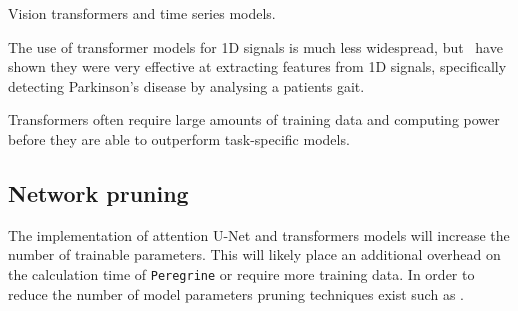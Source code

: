 Vision transformers and time series models.

The use of transformer models for 1D signals is much less widespread, but~\cite{Nguyen_Miah_Bilodeau_Bouachir_2022} have shown they were very effective at extracting features from 1D signals, specifically detecting Parkinson's disease by analysing a patients gait. 

Transformers often require large amounts of training data and computing power before they are able to outperform task-specific models.

\subsection{Network pruning}

The implementation of attention U-Net and transformers models will increase the number of trainable parameters. This will likely place an additional overhead on the calculation time of \texttt{Peregrine} or require more training data. In order to reduce the number of model parameters pruning techniques exist such as \cite{Fang_Ma_Song_Mi_Wang_2023}.

